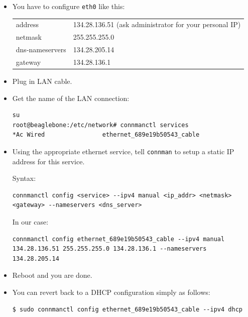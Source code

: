 \documentclass[
	fontsize=10pt
	paper=a4
]{scrartcl}
\begin{document}
\begin{itemize}
\item You have to configure \texttt{eth0} like this:

\begin{tabular}{l l}
address & 134.28.136.51 (ask administrator for your personal IP)\\
netmask & 255.255.255.0 \\
dns-nameservers & 134.28.205.14 \\
gateway & 134.28.136.1
\end{tabular}

\item Plug in LAN cable.

\item Get the name of the LAN connection:
\begin{lstlisting}
su
root@beaglebone:/etc/network# connmanctl services
*Ac Wired                ethernet_689e19b50543_cable
\end{lstlisting}


\item Using the appropriate ethernet service, tell \texttt{connman} to setup a static IP address for this service.

Syntax: 
\begin{lstlisting}[breaklines=true]
connmanctl config <service> --ipv4 manual <ip_addr> <netmask> <gateway> --nameservers <dns_server>
\end{lstlisting}

In our case:
\begin{lstlisting}[breaklines=true]
connmanctl config ethernet_689e19b50543_cable --ipv4 manual 134.28.136.51 255.255.255.0 134.28.136.1 --nameservers 134.28.205.14
\end{lstlisting}


\item Reboot and you are done.


\item You can revert back to a DHCP configuration simply as follows:
\begin{lstlisting}
$ sudo connmanctl config ethernet_689e19b50543_cable --ipv4 dhcp
\end{lstlisting}

\end{itemize}
\end{document}
